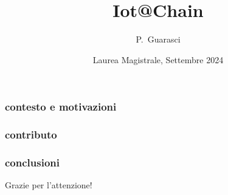 \documentclass{beamer}
\title[Iot@Chain] %
{Iot@Chain}
\author[Paola Guarasic] %
{P.~Guarasci\inst{1}}
\institute[Unical] %
{
  \inst{1}%
  Dipartimento di Matematica e Informatica\\
  Università della Calabria
}
\date[Laurea2024] %
{Laurea Magistrale, Settembre 2024}
\begin{document}
\frame{\titlepage}
\begin{frame}
  \frametitle{contesto e motivazioni}
\end{frame}

\begin{frame}
  \frametitle{contributo}
\end{frame}

\begin{frame}
  \frametitle{conclusioni}
\end{frame}

\begin{frame}
  \centering
  Grazie per l'attenzione!
\end{frame}
\end{document}

